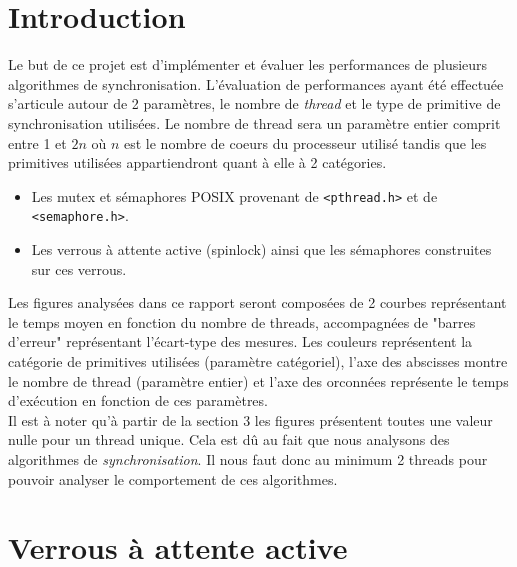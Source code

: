 



\maketitle

\newpage

\section{Introduction}

Le but de ce projet est d'implémenter et évaluer les performances de plusieurs algorithmes de synchronisation.
L'évaluation de performances ayant été effectuée s'articule autour de 2 paramètres, le nombre de \textit{thread} et le type de primitive de synchronisation utilisées.
Le nombre de thread sera un paramètre entier comprit entre 1 et $2n$ où $n$ est le nombre de coeurs du processeur utilisé tandis que les primitives utilisées appartiendront quant à elle à 2 catégories. 
\begin{itemize}
    \item Les mutex et sémaphores POSIX provenant de \texttt{<pthread.h>} et de \texttt{<semaphore.h>}.
    \item Les verrous à attente active (spinlock) ainsi que les sémaphores construites sur ces verrous.
\end{itemize}

Les figures analysées dans ce rapport seront composées de 2 courbes représentant le temps moyen en fonction du nombre de threads, accompagnées de "barres d'erreur" représentant l'écart-type des mesures.
Les couleurs représentent la catégorie de primitives utilisées (paramètre catégoriel), l'axe des abscisses montre le nombre de thread (paramètre entier) et l'axe des orconnées représente le temps d'exécution en fonction de ces paramètres. \\

\noindent Il est à noter qu'à partir de la section 3 les figures présentent toutes une valeur nulle pour un thread unique. Cela est dû au fait que nous analysons des algorithmes de \textit{synchronisation}.
Il nous faut donc au minimum 2 threads pour pouvoir analyser le comportement de ces algorithmes.

\section{Verrous à attente active}

